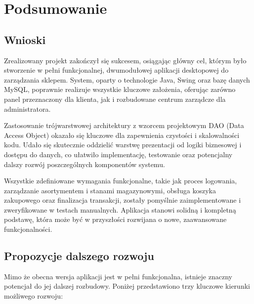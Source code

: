 \chapter{Podsumowanie}
\label{chap:podsumowanie}

\section{Wnioski}
Zrealizowany projekt zakończył się sukcesem, osiągając główny cel, którym było stworzenie w pełni funkcjonalnej, dwumodułowej aplikacji desktopowej do zarządzania sklepem. System, oparty o technologie Java, Swing oraz bazę danych MySQL, poprawnie realizuje wszystkie kluczowe założenia, oferując zarówno panel przeznaczony dla klienta, jak i rozbudowane centrum zarządcze dla administratora.

Zastosowanie trójwarstwowej architektury z wzorcem projektowym DAO (Data Access Object) okazało się kluczowe dla zapewnienia czystości i skalowalności kodu. Udało się skutecznie oddzielić warstwę prezentacji od logiki biznesowej i dostępu do danych, co ułatwiło implementację, testowanie oraz potencjalny dalszy rozwój poszczególnych komponentów systemu.

Wszystkie zdefiniowane wymagania funkcjonalne, takie jak proces logowania, zarządzanie asortymentem i stanami magazynowymi, obsługa koszyka zakupowego oraz finalizacja transakcji, zostały pomyślnie zaimplementowane i zweryfikowane w testach manualnych. Aplikacja stanowi solidną i kompletną podstawę, która może być w przyszłości rozwijana o nowe, zaawansowane funkcjonalności.

\section{Propozycje dalszego rozwoju}
Mimo że obecna wersja aplikacji jest w pełni funkcjonalna, istnieje znaczny potencjał do jej dalszej rozbudowy. Poniżej przedstawiono trzy kluczowe kierunki możliwego rozwoju:

